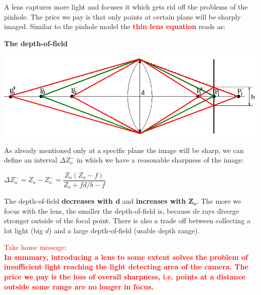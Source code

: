 \documentclass[a4paper, fontsize=8pt, landscape, DIV=1]{scrartcl}
\begin{document}
\begin{multicols*}{4}
\begin{center}
		\end{center}
		A lens captures more light and focuses it which gets rid off the problems of the pinhole. The price we pay is that only points at certain plane will be sharply imaged. Similar to the pinhole model the \textcolor{red}{\textbf{thin lens equation}} reads as:
		\par 
		\textbf{The depth-of-field}\\
		\begin{center}
			\includegraphics[width=0.7\columnwidth]{images//ImageAcq/depth_of_field.png}\\
		\end{center}
		As already mentioned only at a specific plane the image will be sharp, we can define an interval $\Delta Z_o^-$ in which we have a reasonable sharpness of the image:
		\begin{center}
			$\Delta Z_o^-=Z_o-Z_o^-=\dfrac{Z_o(Z_o-f)}{Z_o+fd/b-f}$\\
		\end{center}
		The depth-of-field \textbf{decreases with $\mathbf{d}$} and \textbf{increases with $\mathbf{Z_o}$}. The more we focus with the lens, the smaller the depth-of-field is, because de rays diverge stronger outside of the focal point. There is also a trade off between collecting a lot light (big $d$) and a large depth-of-field (usable depth range).
		\par 
		\textcolor{red}{Take home message}:\\
		\textbf{\textcolor{red}{In summary, introducing a lens to some extent solves the problem of insufficient light reaching the light detecting area of the camera. The price we pay is the loss of overall sharpness, i.e. points at a distance outside some range are no longer in focus.}}
		

\end{multicols*}
\end{document}

